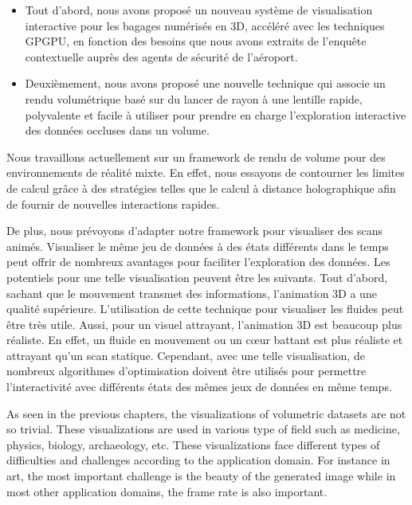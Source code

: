 \begin{itemize}

\item Tout d'abord, nous avons proposé un nouveau système de visualisation interactive pour les bagages numérisés en 3D, accéléré avec les techniques GPGPU, en fonction des besoins que nous avons extraits de l'enquête contextuelle auprès des agents de sécurité de l'aéroport.

\item Deuxièmement, nous avons proposé une nouvelle technique qui associe un rendu volumétrique basé sur du lancer de rayon à une lentille rapide, polyvalente et facile à utiliser pour prendre en charge l'exploration interactive des données occluses dans un  volume.

\end{itemize}


Nous travaillons actuellement sur un framework de rendu de volume pour des environnements de réalité mixte. En effet, nous essayons de contourner les limites de calcul grâce à des stratégies telles que le calcul à distance holographique afin de fournir de nouvelles interactions rapides.

De plus, nous prévoyons d’adapter notre framework pour visualiser des scans animés. Visualiser le même jeu de données à des états différents dans le temps peut offrir de nombreux avantages pour faciliter l'exploration des données. Les potentiels pour une telle visualisation peuvent être les suivants. Tout d’abord, sachant que le mouvement transmet des informations, l’animation 3D a une qualité supérieure. L'utilisation de cette technique pour visualiser les fluides peut être très utile. Aussi, pour un visuel
 attrayant, l'animation 3D est beaucoup plus réaliste. En effet, un fluide en mouvement ou un cœur battant est plus réaliste et
 attrayant qu'un scan statique. Cependant, avec une telle visualisation, de nombreux algorithmes d’optimisation doivent être utilisés pour
     permettre l'interactivité avec différents états des mêmes jeux de données en même temps.

\NewPage


As seen in the previous chapters, the visualizations of volumetric datasets are not so trivial. These visualizations are used in various type of field such as medicine, physics, biology, archaeology, etc. These visualizations face different types of difficulties and challenges according to the application domain. For instance in art, the most important challenge is the beauty of the generated image while in most other application domains, the frame rate is also important.

